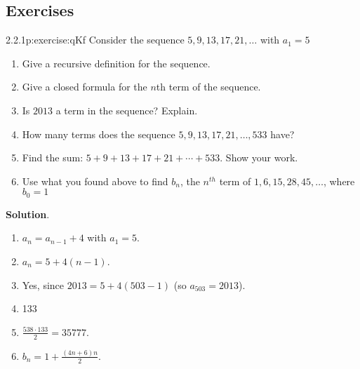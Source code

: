 \documentclass[twoside,11pt,]{book}
\newcommand{\blocktitlefont}{\relax}
\numberwithin{equation}{chapter}
\begin{document}
\subsection*{Exercises}
\begin{divisionsolution}{2.2.1}{}{p:exercise:qKf}%
Consider the sequence \(5, 9, 13, 17, 21, \ldots\) with \(a_1 = 5\)%
\begin{enumerate}[label=(\alph*)]
\item{}Give a recursive definition for the sequence.%
\item{}Give a closed formula for the \(n\)th term of the sequence.%
\item{}Is \(2013\) a term in the sequence? Explain.%
\item{}How many terms does the sequence \(5, 9, 13, 17, 21, \ldots, 533\) have?%
\item{}Find the sum: \(5 + 9 + 13 + 17 + 21 + \cdots + 533\). Show your work.%
\item{}Use what you found above to find \(b_n\), the \(n^{th}\) term of \(1, 6, 15, 28, 45, \ldots\), where \(b_0 = 1\)%
\end{enumerate}
%
\par\smallskip%
\noindent\textbf{\blocktitlefont Solution}.\quad{}%
\begin{enumerate}[label=(\alph*)]
\item{}\(a_n = a_{n-1} + 4\) with \(a_1 = 5\).%
\item{}\(a_n = 5 + 4(n-1)\).%
\item{}Yes, since \(2013 = 5 + 4(503-1)\) (so \(a_{503} = 2013\)).%
\item{}133%
\item{}\(\frac{538\cdot 133}{2} = 35777\).%
\item{}\(b_n = 1 + \frac{(4n+6)n}{2}\).%
\end{enumerate}
%
\end{divisionsolution}%
\end{document}
